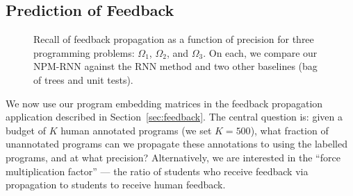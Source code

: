 \subsection{Prediction of Feedback}

\begin{figure}[t]
\centering
{}
\caption[Precision recall of feedback propagation]{
Recall of feedback propagation as a function of precision for three programming problems:
 $\Omega_1$,
  $\Omega_2$, and
   $\Omega_3$.  On each, we compare our NPM-RNN against the RNN
  method and two other baselines (bag of trees and unit tests).
 }
\label{fig:force}
\end{figure}

We now use our program embedding matrices in the feedback propagation
application described in Section~\ref{sec:feedback}.  
The central question is: given a budget of $K$ human annotated programs (we set $K=500$), what fraction of 
unannotated programs can we propagate these annotations to using the labelled programs, and at what precision?  Alternatively, we are interested in the ``force multiplication factor'' --- the ratio of students who receive feedback via propagation to students to receive human feedback.

